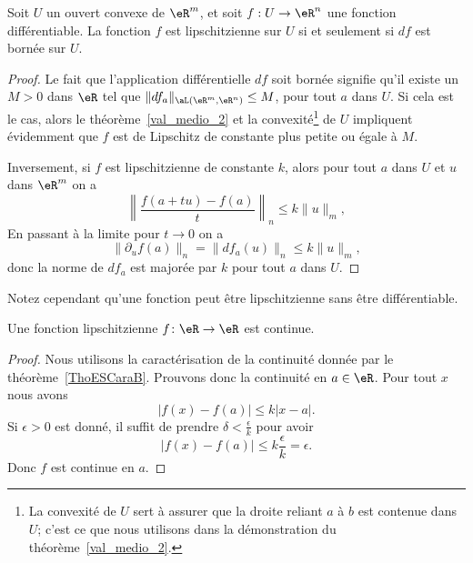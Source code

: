 \begin{proposition}
	Soit  \( U\) un ouvert convexe  de \( \eR^m\), et soit \( f:U\to \eR^n\) une fonction différentiable. La fonction \( f\) est lipschitzienne sur \( U\) si et seulement si \( df\) est bornée sur \( U\).
\end{proposition}
\begin{proof}
	Le fait que l'application différentielle \( df\) soit bornée signifie qu'il existe un \( M>0\) dans \( \eR\) tel que \( \|df_a\|_{\aL(\eR^m,\eR^n)}\leq M\), pour tout \( a\) dans \( U\). Si cela est le cas, alors le théorème~\ref{val_medio_2} et la convexité\footnote{La convexité de \( U\) sert à assurer que la droite reliant \( a\) à \( b\) est contenue dans \( U\); c'est ce que nous utilisons dans la démonstration du théorème~\ref{val_medio_2}.} de \( U\) impliquent évidemment que \( f\) est de Lipschitz de constante plus petite ou égale à \( M\).

	Inversement, si \( f\) est lipschitzienne de constante \( k\), alors pour tout \( a\) dans \( U\) et \( u\) dans \( \eR^m\) on a
	\[
		\left\|\frac{f(a+tu)-f(a)}{t}\right\|_n\leq k \|u\|_m,
	\]
	En passant à la limite pour \( t\to 0\) on a
	\[
		\|\partial_u f(a)\|_n=\|df_a(u)\|_n\leq k \|u\|_m,
	\]
	donc la norme de \( df_a\) est majorée par \( k\) pour tout \( a\) dans \( U\).
\end{proof}

Notez cependant qu'une fonction peut être lipschitzienne sans être différentiable.

\begin{proposition} \label{PropFZgFTEW}
	Une fonction lipschitzienne \( f\colon \eR\to \eR\) est continue.
\end{proposition}

\begin{proof}
	Nous utilisons la caractérisation de la continuité donnée par le théorème~\ref{ThoESCaraB}. Prouvons donc la continuité en \( a\in \eR\). Pour tout \( x\) nous avons
	\begin{equation}
		\big| f(x)-f(a) \big|\leq k| x-a |.
	\end{equation}
	Si \( \epsilon>0\) est donné, il suffit de prendre \( \delta<\frac{ \epsilon }{ k }\) pour avoir
	\begin{equation}
		\big| f(x)-f(a) \big|\leq k\frac{ \epsilon }{ k }=\epsilon.
	\end{equation}
	Donc \( f\) est continue en \( a\).
\end{proof}

